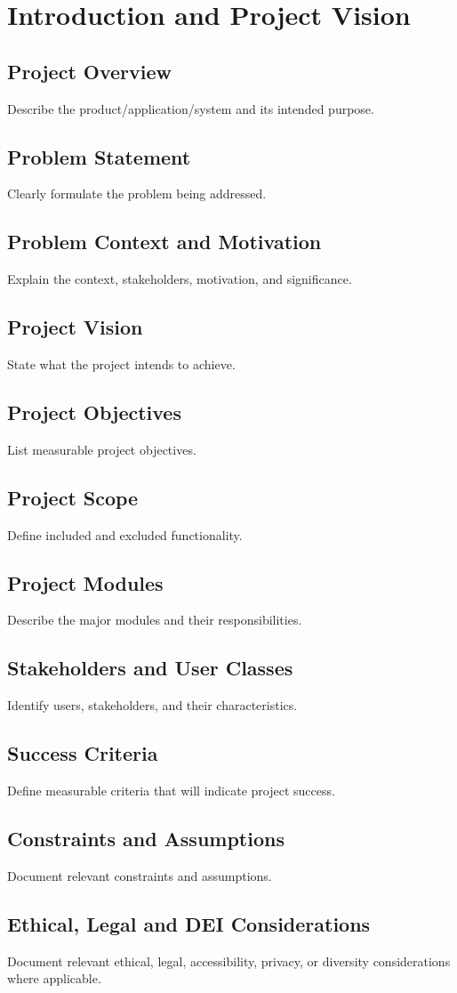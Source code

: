 \chapter{Introduction and Project Vision}
\section{Project Overview}
Describe the product/application/system and its intended purpose.
\section{Problem Statement}
Clearly formulate the problem being addressed.
\section{Problem Context and Motivation}
Explain the context, stakeholders, motivation, and significance.
\section{Project Vision}
State what the project intends to achieve.
\section{Project Objectives}
List measurable project objectives.
\section{Project Scope}
Define included and excluded functionality.
\section{Project Modules}
Describe the major modules and their responsibilities.
\section{Stakeholders and User Classes}
Identify users, stakeholders, and their characteristics.
\section{Success Criteria}
Define measurable criteria that will indicate project success.
\section{Constraints and Assumptions}
Document relevant constraints and assumptions.
\section{Ethical, Legal and DEI Considerations}
Document relevant ethical, legal, accessibility, privacy, or diversity considerations where applicable.
